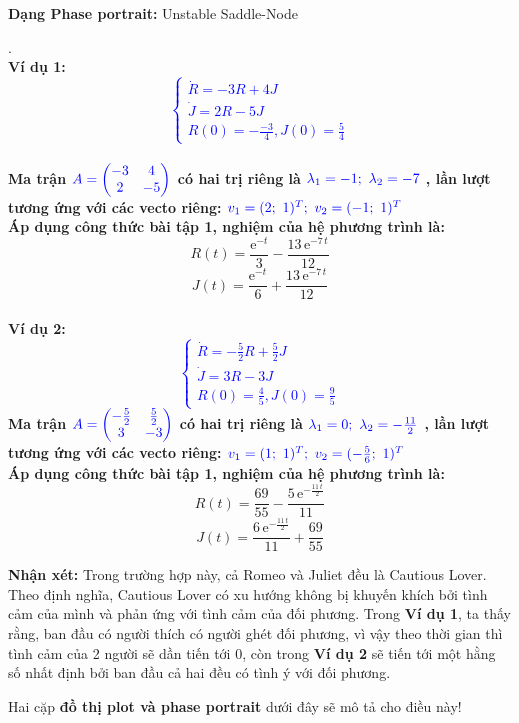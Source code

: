 \textbf{Dạng Phase portrait: } Unstable Saddle-Node
\pagebreak
\begin{tcbdoublebox}[title={3. Cautious Lover and Cautious Lover}]
\mdseries .\\
\bfseries Ví dụ 1: \\
\textcolor{blue}{$$\left\{\begin{matrix}
\dot{R} =  -3R + 4J \\ 
\dot{J} =  2R-5J\\ 
R(0)= - \frac{-3}{4}, J(0)=\frac{5}{4}
\end{matrix}\right.$$}\\
\mdseries Ma trận $\color{blue}A=\begin{pmatrix}
-3 & 4\\ 
2 & -5
\end{pmatrix}$ có hai trị riêng là 
$\color{blue}\lambda_{1}=-1;\ \lambda_{2}=-7$
, lần lượt tương ứng với các vecto riêng:
$\color{blue}v_{1} = (2;\ 1)^{T};\ v_{2}=(-1;\ 1)^{T}$\\Áp dụng công thức bài tập 1, nghiệm của hệ phương trình là:
$$R(t)=\frac{{\mathrm{e}}^{-t}}{3}-\frac{13\,{\mathrm{e}}^{-7\,t}}{12} $$
$$J(t)=\frac{{\mathrm{e}}^{-t}}{6}+\frac{13\,{\mathrm{e}}^{-7\,t}}{12}$$
\\
\bfseries Ví dụ 2:\\
\textcolor{blue}{$$\left\{\begin{matrix}
\dot{R} =  -\frac{5}{2}R + \frac{5}{2}J \\ 
\dot{J} =  3R -3J\\ 
R(0)= \frac{4}{5}, J(0)=\frac{9}{5}
\end{matrix}\right.$$}
\mdseries Ma trận $\color{blue}A=\begin{pmatrix}
-\frac{5}{2} & \frac{5}{2}\\ 
3 & -3
\end{pmatrix}$ có hai trị riêng là 
$\color{blue}\lambda_{1}=0;\ \lambda_{2}=-\frac{11}{2}$
, lần lượt tương ứng với các vecto riêng:
$\color{blue}v_{1} = (1;\ 1)^{T};\ v_{2}=(-\frac{5}{6};\ 1)^{T}$\\Áp dụng công thức bài tập 1, nghiệm của hệ phương trình là:
$$R(t)=\frac{69}{55}-\frac{5\,{\mathrm{e}}^{-\frac{11\,t}{2}}}{11}$$
$$J(t)=\frac{6\,{\mathrm{e}}^{-\frac{11\,t}{2}}}{11}+\frac{69}{55}$$

\textbf{Nhận xét: } Trong trường hợp này, cả Romeo và Juliet đều là Cautious Lover. Theo định nghĩa, Cautious Lover có xu hướng không bị khuyến khích bởi tình cảm của mình và phản ứng với tình cảm của đối phương. Trong \textbf{Ví dụ 1}, ta thấy rằng, ban đầu có người thích có người ghét đối phương, vì vậy theo thời gian thì tình cảm của 2 người sẽ dần tiến tới 0, còn trong \textbf{Ví dụ 2} sẽ tiến tới một hằng số nhất định bởi ban đầu cả hai đều có tình ý với đối phương.

Hai cặp \textbf{đồ thị plot và phase portrait} dưới đây sẽ mô tả cho điều này!
\end{tcbdoublebox}
